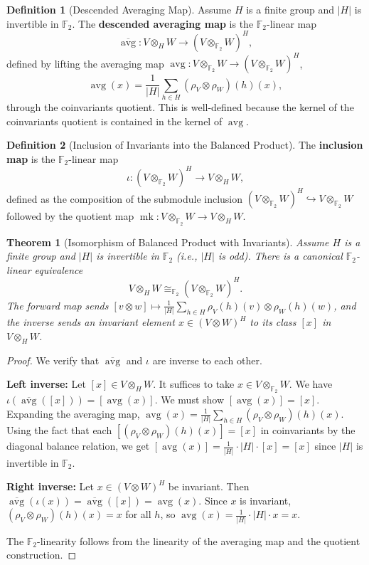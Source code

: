 \documentclass[11pt]{article}
\theoremstyle{plain}
\newtheorem*{theorem}{Theorem}
\theoremstyle{definition}
\newtheorem*{definition}{Definition}
\theoremstyle{remark}
\begin{document}
\begin{definition}[Descended Averaging Map]
Assume $H$ is a finite group and $|H|$ is invertible in $\mathbb{F}_2$. The \textbf{descended averaging map} is the $\mathbb{F}_2$-linear map
\[
\overline{\operatorname{avg}} : V \otimes_H W \longrightarrow (V \otimes_{\mathbb{F}_2} W)^H,
\]
defined by lifting the averaging map $\operatorname{avg} : V \otimes_{\mathbb{F}_2} W \to (V \otimes_{\mathbb{F}_2} W)^H$,
\[
\operatorname{avg}(x) = \frac{1}{|H|} \sum_{h \in H} (\rho_V \otimes \rho_W)(h)(x),
\]
through the coinvariants quotient. This is well-defined because the kernel of the coinvariants quotient is contained in the kernel of $\operatorname{avg}$.
\end{definition}

\begin{definition}[Inclusion of Invariants into the Balanced Product]
The \textbf{inclusion map} is the $\mathbb{F}_2$-linear map
\[
\iota : (V \otimes_{\mathbb{F}_2} W)^H \longrightarrow V \otimes_H W,
\]
defined as the composition of the submodule inclusion $(V \otimes_{\mathbb{F}_2} W)^H \hookrightarrow V \otimes_{\mathbb{F}_2} W$ followed by the quotient map $\operatorname{mk} : V \otimes_{\mathbb{F}_2} W \to V \otimes_H W$.
\end{definition}

\begin{theorem}[Isomorphism of Balanced Product with Invariants]
Assume $H$ is a finite group and $|H|$ is invertible in $\mathbb{F}_2$ (i.e., $|H|$ is odd). There is a canonical $\mathbb{F}_2$-linear equivalence
\[
V \otimes_H W \cong_{\mathbb{F}_2} (V \otimes_{\mathbb{F}_2} W)^H.
\]
The forward map sends $[v \otimes w] \mapsto \frac{1}{|H|}\sum_{h \in H} \rho_V(h)(v) \otimes \rho_W(h)(w)$, and the inverse sends an invariant element $x \in (V \otimes W)^H$ to its class $[x]$ in $V \otimes_H W$.
\end{theorem}

\begin{proof}
We verify that $\overline{\operatorname{avg}}$ and $\iota$ are inverse to each other.

\textbf{Left inverse:} Let $[x] \in V \otimes_H W$. It suffices to take $x \in V \otimes_{\mathbb{F}_2} W$. We have $\iota(\overline{\operatorname{avg}}([x])) = [\operatorname{avg}(x)]$. We must show $[\operatorname{avg}(x)] = [x]$. Expanding the averaging map, $\operatorname{avg}(x) = \frac{1}{|H|}\sum_{h \in H} (\rho_V \otimes \rho_W)(h)(x)$. Using the fact that each $[(\rho_V \otimes \rho_W)(h)(x)] = [x]$ in coinvariants by the diagonal balance relation, we get $[\operatorname{avg}(x)] = \frac{1}{|H|} \cdot |H| \cdot [x] = [x]$ since $|H|$ is invertible in $\mathbb{F}_2$.

\textbf{Right inverse:} Let $x \in (V \otimes W)^H$ be invariant. Then $\overline{\operatorname{avg}}(\iota(x)) = \overline{\operatorname{avg}}([x]) = \operatorname{avg}(x)$. Since $x$ is invariant, $(\rho_V \otimes \rho_W)(h)(x) = x$ for all $h$, so $\operatorname{avg}(x) = \frac{1}{|H|} \cdot |H| \cdot x = x$.

The $\mathbb{F}_2$-linearity follows from the linearity of the averaging map and the quotient construction.
\end{proof}
\end{document}
